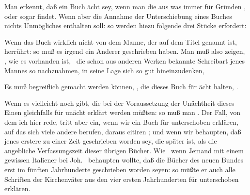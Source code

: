 Man erkennt, daß ein Buch ächt sey, wenn man die  aus was immer für Gründen , oder sogar  findet. Wenn aber die Annahme der Unterschiebung eines Buches nichts Unmögliches enthalten soll: so werden hiezu folgende drei Stücke erfordert:
\begin{aufza}
\item  Wenn das Buch wirklich nicht von dem Manne, der auf dem Titel genannt ist, herrührt: so muß es irgend ein Anderer geschrieben haben. Man muß also zeigen, , wie es vorhanden ist, \zB\ die schon aus anderen Werken bekannte Schreibart jenes Mannes so nachzuahmen, in seine Lage sich so gut hineinzudenken, \usw
\item  Es muß begreiflich gemacht werden können, , die dieses Buch für ächt halten, .~
\item  Wenn es vielleicht noch  gibt, die bei der Voraussetzung der Unächtheit dieses Einen gleichfalls für unächt erklärt werden müßten: so muß man . Der Fall, von dem ich hier rede, tritt aber ein, wenn wir ein Buch für unterschoben erklären, auf das sich viele andere berufen, daraus citiren \usw ; und wenn wir behaupten, daß jenes erstere zu einer Zeit geschrieben worden sey, die später ist, als die angebliche Verfassungszeit dieser übrigen Bücher. Wie \zB\ wenn Jemand mit einem gewissen Italiener bei Joh.~ behaupten wollte, daß die Bücher des neuen Bundes erst im fünften Jahrhunderte geschrieben worden seyen: so müßte er auch alle Schriften der Kirchenväter aus den vier ersten Jahrhunderten für unterschoben erklären.
\end{aufza}

